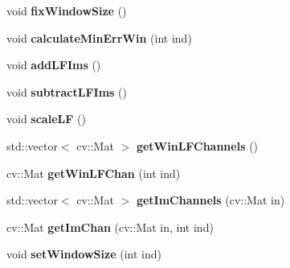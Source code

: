 \begin{DoxyCompactItemize}
\item 
void {\bfseries fix\+Window\+Size} ()\hypertarget{classLightfield_a3cd49b8935450d3fc448d44d92717f5c}{}\label{classLightfield_a3cd49b8935450d3fc448d44d92717f5c}

\item 
void {\bfseries calculate\+Min\+Err\+Win} (int ind)\hypertarget{classLightfield_af7885b6dd73a593cf3f8e2d0c747ebfd}{}\label{classLightfield_af7885b6dd73a593cf3f8e2d0c747ebfd}

\item 
void {\bfseries add\+L\+F\+Ims} ()\hypertarget{classLightfield_a8039d89e9e81202f6e875073f6dba917}{}\label{classLightfield_a8039d89e9e81202f6e875073f6dba917}

\item 
void {\bfseries subtract\+L\+F\+Ims} ()\hypertarget{classLightfield_a19566281f8bdb8a332243fd7352533d1}{}\label{classLightfield_a19566281f8bdb8a332243fd7352533d1}

\item 
void {\bfseries scale\+LF} ()\hypertarget{classLightfield_a1e781a6364a5cb848aed05d6a7246070}{}\label{classLightfield_a1e781a6364a5cb848aed05d6a7246070}

\item 
std\+::vector$<$ cv\+::\+Mat $>$ {\bfseries get\+Win\+L\+F\+Channels} ()\hypertarget{classLightfield_a1c477d74a229e4a90bbfa59360c41163}{}\label{classLightfield_a1c477d74a229e4a90bbfa59360c41163}

\item 
cv\+::\+Mat {\bfseries get\+Win\+L\+F\+Chan} (int ind)\hypertarget{classLightfield_a35944f792940a847cb6444897f01d6f7}{}\label{classLightfield_a35944f792940a847cb6444897f01d6f7}

\item 
std\+::vector$<$ cv\+::\+Mat $>$ {\bfseries get\+Im\+Channels} (cv\+::\+Mat in)\hypertarget{classLightfield_a3f0e5049e23ca98310d0c835b85449ab}{}\label{classLightfield_a3f0e5049e23ca98310d0c835b85449ab}

\item 
cv\+::\+Mat {\bfseries get\+Im\+Chan} (cv\+::\+Mat in, int ind)\hypertarget{classLightfield_a5001ad2bdf1bde074ab4575d7fc02554}{}\label{classLightfield_a5001ad2bdf1bde074ab4575d7fc02554}

\item 
void {\bfseries set\+Window\+Size} (int ind)\hypertarget{classLightfield_a70008fe6f77212e40c7d9627de36a7b9}{}\label{classLightfield_a70008fe6f77212e40c7d9627de36a7b9}


\end{DoxyCompactItemize}
